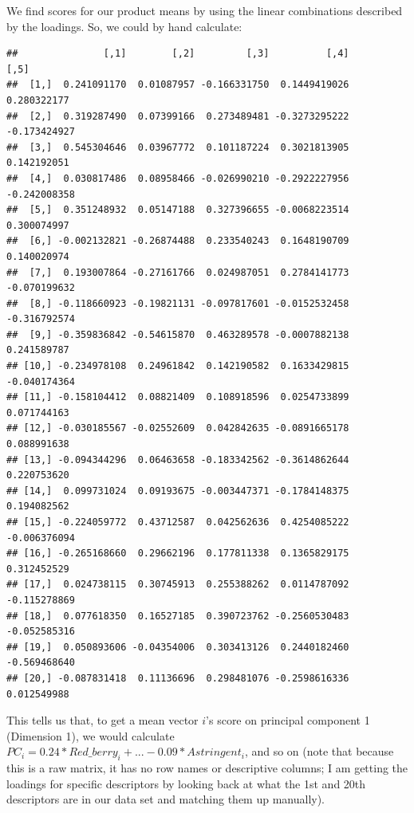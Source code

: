 \documentclass[
]{book}
\newenvironment{Shaded}{\begin{snugshade}}{\end{snugshade}}
\newcommand{\NormalTok}[1]{#1}
\newcommand{\SpecialCharTok}[1]{\textcolor[rgb]{0.81,0.36,0.00}{\textbf{#1}}}
\begin{document}
We find scores for our product means by using the linear combinations described by the loadings. So, we could by hand calculate:

\begin{Shaded}
\end{Shaded}

\begin{verbatim}
##               [,1]        [,2]         [,3]          [,4]         [,5]
##  [1,]  0.241091170  0.01087957 -0.166331750  0.1449419026  0.280322177
##  [2,]  0.319287490  0.07399166  0.273489481 -0.3273295222 -0.173424927
##  [3,]  0.545304646  0.03967772  0.101187224  0.3021813905  0.142192051
##  [4,]  0.030817486  0.08958466 -0.026990210 -0.2922227956 -0.242008358
##  [5,]  0.351248932  0.05147188  0.327396655 -0.0068223514  0.300074997
##  [6,] -0.002132821 -0.26874488  0.233540243  0.1648190709  0.140020974
##  [7,]  0.193007864 -0.27161766  0.024987051  0.2784141773 -0.070199632
##  [8,] -0.118660923 -0.19821131 -0.097817601 -0.0152532458 -0.316792574
##  [9,] -0.359836842 -0.54615870  0.463289578 -0.0007882138  0.241589787
## [10,] -0.234978108  0.24961842  0.142190582  0.1633429815 -0.040174364
## [11,] -0.158104412  0.08821409  0.108918596  0.0254733899  0.071744163
## [12,] -0.030185567 -0.02552609  0.042842635 -0.0891665178  0.088991638
## [13,] -0.094344296  0.06463658 -0.183342562 -0.3614862644  0.220753620
## [14,]  0.099731024  0.09193675 -0.003447371 -0.1784148375  0.194082562
## [15,] -0.224059772  0.43712587  0.042562636  0.4254085222 -0.006376094
## [16,] -0.265168660  0.29662196  0.177811338  0.1365829175  0.312452529
## [17,]  0.024738115  0.30745913  0.255388262  0.0114787092 -0.115278869
## [18,]  0.077618350  0.16527185  0.390723762 -0.2560530483 -0.052585316
## [19,]  0.050893606 -0.04354006  0.303413126  0.2440182460 -0.569468640
## [20,] -0.087831418  0.11136696  0.298481076 -0.2598616336  0.012549988
\end{verbatim}

This tells us that, to get a mean vector \(i\)'s score on principal component 1 (Dimension 1), we would calculate \(PC_i = 0.24 * Red\_berry_i + ... -0.09 * Astringent_i\), and so on (note that because this is a raw matrix, it has no row names or descriptive columns; I am getting the loadings for specific descriptors by looking back at what the 1st and 20th descriptors are in our data set and matching them up manually).
\end{document}
